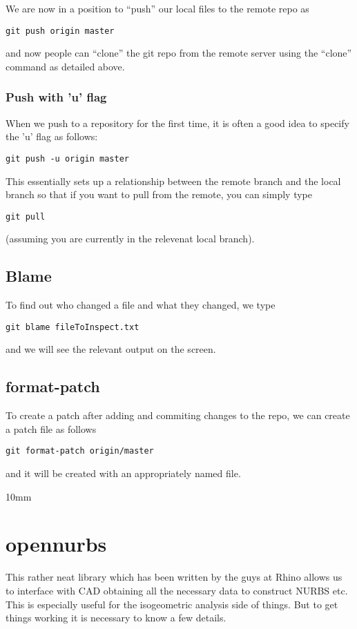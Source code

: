 \documentclass[a4paper, 10pt]{article}
\begin{document}
We are now in a position to ``push'' our local files to the remote
repo as
\begin{verbatim}
git push origin master
\end{verbatim}
and now people can ``clone'' the git repo from the remote server using
the ``clone'' command as detailed above.

\subsubsection*{Push with 'u' flag}
\label{sec:push}

When we push to a repository for the first time, it is often a good
idea to specify the 'u' flag as follows:
\begin{verbatim}
git push -u origin master
\end{verbatim}
This essentially sets up a relationship between the remote branch and
the local branch so that if you want to pull from the remote, you can
simply type
\begin{verbatim}
git pull
\end{verbatim}
(assuming you are currently in the relevenat local branch).

\subsection*{Blame}
\label{sec:blame}

To find out who changed a file and what they changed, we type
\begin{verbatim}
git blame fileToInspect.txt
\end{verbatim}
and we will see the relevant output on the screen.

\subsection*{format-patch}
\label{sec:format-patch}

To create a patch after adding and commiting changes to the repo, we
can create a patch file as follows
\begin{verbatim}
git format-patch origin/master
\end{verbatim}
and it will be created with an appropriately named file.

{10mm}
\section*{opennurbs}

This rather neat library which has been written by the guys at Rhino allows us to interface with CAD obtaining all the necessary data to construct NURBS etc. This is especially useful for the isogeometric analysis side of things. But to get things working it is necessary to know a few details.
\end{document}

